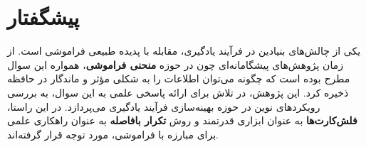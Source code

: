 \documentclass[12pt]{report}
\begin{document}
%



\chapter*{پیشگفتار}

یکی از چالش‌های بنیادین در فرآیند یادگیری، مقابله با پدیده طبیعی فراموشی است. از زمان پژوهش‌های پیشگامانه‌ای چون  در حوزه \textbf{منحنی فراموشی}، همواره این سوال مطرح بوده است که چگونه می‌توان اطلاعات را به شکلی مؤثر و ماندگار در حافظه ذخیره کرد. این پژوهش، در تلاش برای ارائه پاسخی علمی به این سوال، به بررسی رویکردهای نوین در حوزه بهینه‌سازی فرآیند یادگیری می‌پردازد. در این راستا، \textbf{فلش‌کارت‌ها} به عنوان ابزاری قدرتمند و روش \textbf{تکرار بافاصله} به عنوان راهکاری علمی برای مبارزه با فراموشی، مورد توجه قرار گرفته‌اند.
\end{document}
